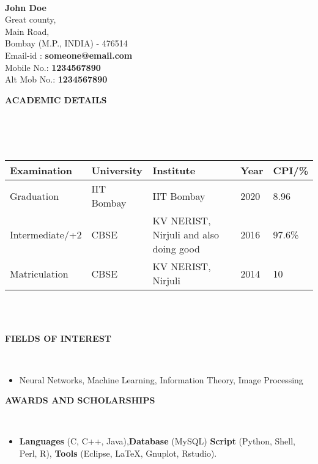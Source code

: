 \documentclass[a4paper,10pt]{article}
\newcommand{\lsep}{-0.5cm}
\newcommand{\resheading}[1]{{\small \colorbox{mygrey}{\begin{minipage}{0.975\textwidth}{\textbf{#1 \vphantom{p\^{E}}}}\end{minipage}}}}
\begin{document}
\hspace{0.5cm}\\[-0.2cm]

\textbf{John Doe} \\
\indent Great county, \\
\indent Main Road,  \\
\indent Bombay (M.P., INDIA) - 476514\\
\indent Email-id : \textbf{someone@email.com} \\
\indent Mobile No.: \textbf{1234567890} \\
\indent Alt Mob No.: \textbf{1234567890} \\

\resheading{\textbf{ACADEMIC DETAILS} }\\[\lsep]
\\ \\
\indent \begin{tabular}{ l @{\hskip 0.15in} l @{\hskip 0.15in} l @{\hskip 0.15in} l @{\hskip 0.15in} l }
\hline
\textbf{Examination} & \textbf{University} & \textbf{Institute } & \textbf{Year} & \textbf{CPI/\%} \\
\hline
Graduation      & IIT Bombay & IIT Bombay & 2020 & 8.96 \\
Intermediate/+2 & CBSE & KV NERIST, Nirjuli and also doing good   & 2016 & 97.6\%\\
Matriculation & CBSE & KV NERIST, Nirjuli & 2014 & 10\\
\hline
\end{tabular}
\\ \\

\resheading{\textbf{FIELDS OF INTEREST} }\\[\lsep]
\begin{itemize}
\item \noindent Neural Networks, Machine Learning, Information Theory, Image Processing
\end{itemize}

\resheading{\textbf{AWARDS AND SCHOLARSHIPS} }\\[\lsep]
\begin{itemize}
\item \noindent \textbf{Languages} (C, C++, Java),\textbf{Database} (MySQL) \textbf{Script} (Python, Shell, Perl, R), \textbf{Tools} (Eclipse, \LaTeX, Gnuplot, Rstudio).
\end{itemize}
\end{document}
